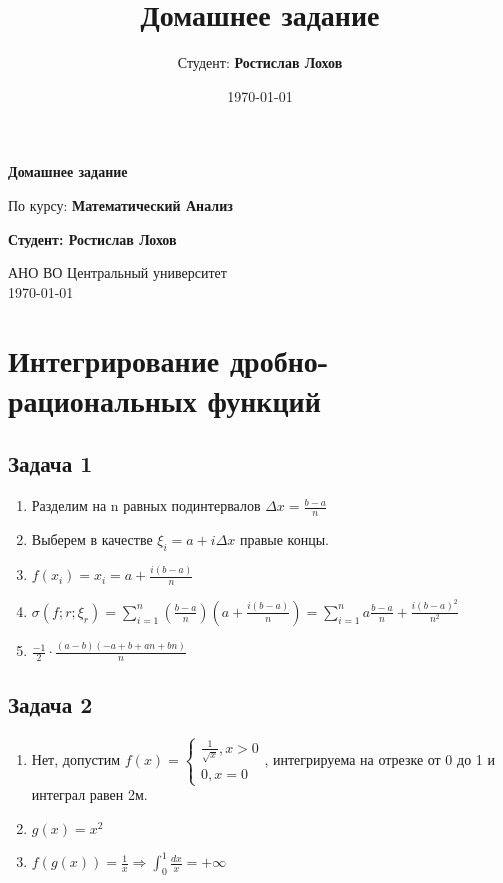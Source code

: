 \documentclass[a4paper,12pt]{article}
\title{Домашнее задание}
\author{Студент: \textbf{Ростислав Лохов}}
\date{\today}
\begin{document}
\begin{titlepage}
	\centering
	\vspace*{1cm}

	\Huge
	\textbf{Домашнее задание}

	\vspace{0.5cm}
	\LARGE
	По курсу: \textbf{Математический Анализ}

	\vspace{1.5cm}

	\textbf{Студент: Ростислав Лохов}

	\vfill

	\Large
	АНО ВО Центральный университет\\
	\vspace{0.3cm}
	\today

\end{titlepage}

\tableofcontents
\newpage

\section{Интегрирование дробно-рациональных функций}

\subsection{Задача 1}

\begin{enumerate}
    \item Разделим на n равных подинтервалов $\Delta x = \frac{b-a}{n}$
    \item Выберем в качестве $\xi_i=a+i \Delta x$ правые концы.
    \item $f(x_i)=x_i = a+\frac{i(b-a)}{n}$
    \item $\sigma (f;r; \xi_r) = \sum_{i=1}^{n}(\frac{b-a}{n})(a+\frac{i(b-a)}{n}) = \sum_{i=1}^{n}a\frac{b-a}{n}+\frac{i(b-a)^2}{n^2}$
    \item $\frac{-1}{2} \cdot \frac{(a - b)(-a + b + a n + b n)}{n}$
\end{enumerate}

\subsection{Задача 2}
\begin{enumerate}
    \item Нет, допустим $f(x)=\begin{cases}
        \frac{1}{\sqrt{x}}, x>0 \\
        0, x=0
    \end{cases}$, интегрируема на отрезке от 0 до 1 и интеграл равен 2м.
    \item $g(x)=x^2$
    \item $f(g(x))=\frac{1}{x} \Rightarrow \int_{0}^{1}\frac{dx}{x}=+\infty$
\end{enumerate}
\end{document}
